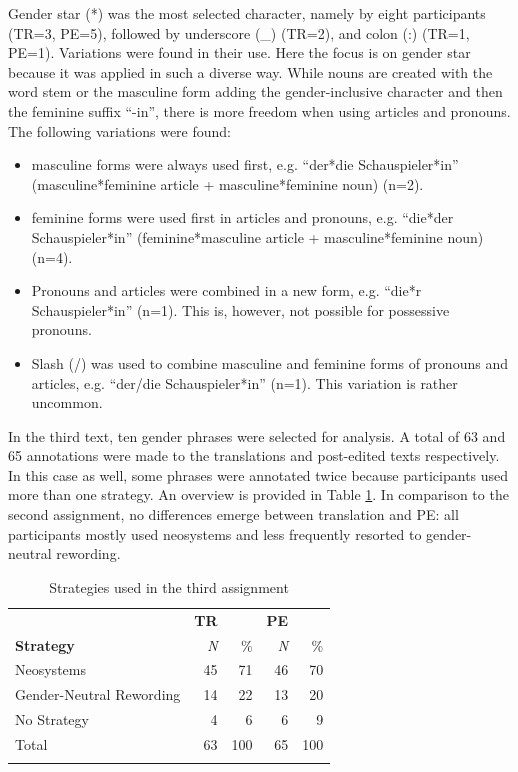 Gender star (*) was the most selected character, namely by eight participants (TR=3, PE=5), followed by underscore (\_) (TR=2), and colon (:) (TR=1, PE=1). Variations were found in their use. Here the focus is on gender star because it was applied in such a diverse way. While nouns are created with the word stem or the masculine form adding the gender-inclusive character and then the feminine suffix ``-in'', there is more freedom when using articles and pronouns. The following variations were found:
\begin{itemize}
\setlength\itemsep{-0.5em}
    \item masculine forms were always used first, e.g. ``der*die Schauspieler*in'' (masculine*feminine article + masculine*feminine noun) (n=2).
    \item feminine forms were used first in articles and pronouns, e.g. ``die*der Schauspieler*in'' (feminine*masculine article + masculine*feminine noun) (n=4).
    \item Pronouns and articles were combined in a new form, e.g. ``die*r Schauspieler*in'' (n=1). This is, however, not possible for possessive pronouns.
    \item Slash (/) was used to combine masculine and feminine forms of pronouns and articles, e.g. ``der/die Schauspieler*in'' (n=1). This variation is rather uncommon. 
\end{itemize}

In the third text, ten gender phrases were selected for analysis. A total of 63 and 65 annotations were made to the translations and post-edited texts respectively. In this case as well, some phrases were annotated twice because participants used more than one strategy. An overview is provided in Table \ref{tab:strategies3}. In comparison to the second assignment, no differences emerge between translation and PE: all participants mostly used neosystems and less frequently resorted to gender-neutral rewording. 

\begin{table}[!ht]
    \centering
    \caption{Strategies used in the third assignment}
    \begin{tabular}{lrrrr} \lsptoprule
        & \textbf{TR} & & \textbf{PE} &  \\ 
        \textbf{Strategy} & \textit{N} & \% & \textit{N} & \% \\ \midrule
         Neosystems & 45 & 71 & 46 & 70 \\ %
         Gender-Neutral Rewording & 14 & 22 & 13 & 20 \\ %
         No Strategy & 4 & 6 & 6 & 9 \\ \midrule
         Total & 63 & 100 & 65 & 100 \\
\lspbottomrule
    \end{tabular}
    \label{tab:strategies3}
\end{table}

